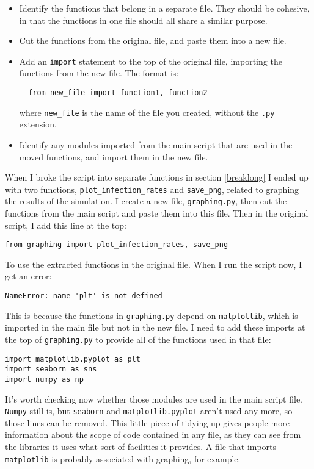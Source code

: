 \documentclass[a4paper]{article}
\begin{document}
\begin{itemize}
\item Identify the functions that belong in a separate file. They should be cohesive, in that the functions in one file should all share a similar purpose.
\item Cut the functions from the original file, and paste them into a new file.
\item Add an \texttt{import} statement to the top of the original file, importing the functions from the new file. The format is:
\begin{verbatim}
  from new_file import function1, function2
\end{verbatim}
where \texttt{new\_file} is the name of the file you created, without the \texttt{.py} extension.
\item Identify any modules imported from the main script that are used in the moved functions, and import them in the new file.
\end{itemize}

When I broke the script into separate functions in section \ref{breaklong} I ended up with two functions, \texttt{plot\_infection\_rates} and \texttt{save\_png}, related to graphing the results of the simulation.
I create a new file, \texttt{graphing.py}, then cut the functions from the main script and paste them into this file.
Then in the original script, I add this line at the top:

\begin{verbatim}
from graphing import plot_infection_rates, save_png
\end{verbatim}

To use the extracted functions in the original file. When I run the script now, I get an error:

\begin{verbatim}
NameError: name 'plt' is not defined
\end{verbatim}

This is because the functions in \texttt{graphing.py} depend on \texttt{matplotlib}, which is imported in the main file but not in the new file.
I need to add these imports at the top of \texttt{graphing.py} to provide all of the functions used in that file:

\begin{verbatim}
import matplotlib.pyplot as plt
import seaborn as sns
import numpy as np
\end{verbatim}

It's worth checking now whether those modules are used in the main script file.
\texttt{Numpy} still is, but \texttt{seaborn} and \texttt{matplotlib.pyplot} aren't used any more, so those lines can be removed.
This little piece of tidying up gives people more information about the scope of code contained in any file, as they can see from the libraries it uses what sort of facilities it provides.
A file that imports \texttt{matplotlib} is probably associated with graphing, for example.
\end{document}

